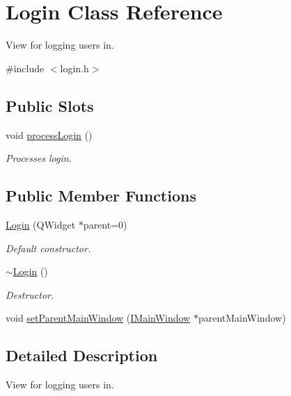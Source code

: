 \hypertarget{class_login}{\section{\-Login \-Class \-Reference}
\label{class_login}
}


\-View for logging users in.  




{\ttfamily \#include $<$login.\-h$>$}

\subsection*{\-Public \-Slots}
\begin{DoxyCompactItemize}
\item 
void \hyperlink{class_login_a2a8b940105c5091919faa809df824ad7}{process\-Login} ()
\begin{DoxyCompactList}\small\item\em \-Processes login. \end{DoxyCompactList}\end{DoxyCompactItemize}
\subsection*{\-Public \-Member \-Functions}
\begin{DoxyCompactItemize}
\item 
\hyperlink{class_login_a021ebcfd29b2a30e3f5c5bbb36589381}{\-Login} (\-Q\-Widget $\ast$parent=0)
\begin{DoxyCompactList}\small\item\em \-Default constructor. \end{DoxyCompactList}\item 
\hyperlink{class_login_a659bc7233ec12c79b9fa523c1734fbbc}{$\sim$\-Login} ()
\begin{DoxyCompactList}\small\item\em \-Destructor. \end{DoxyCompactList}\item 
void \hyperlink{class_login_a86305f5945b52ccf6383a60314da54c2}{set\-Parent\-Main\-Window} (\hyperlink{class_i_main_window}{\-I\-Main\-Window} $\ast$parent\-Main\-Window)
\end{DoxyCompactItemize}


\subsection{\-Detailed \-Description}
\-View for logging users in. 

